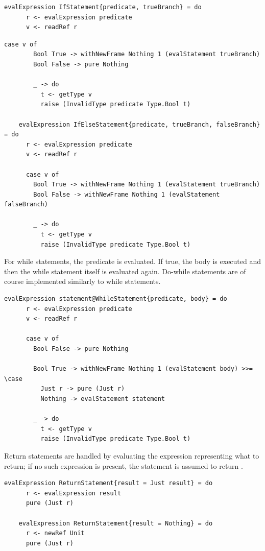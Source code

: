 \documentclass[UdineBachThesis,american,11pt]{PhdThesis}
\begin{document}
  \begin{lstlisting}[gobble=4,basicstyle=\ttfamily\small]
    evalExpression IfStatement{predicate, trueBranch} = do
      r <- evalExpression predicate
      v <- readRef r
  \end{lstlisting}

  \newpage

  \begin{lstlisting}[gobble=4,basicstyle=\ttfamily\small]
      case v of
        Bool True -> withNewFrame Nothing 1 (evalStatement trueBranch)
        Bool False -> pure Nothing

        _ -> do
          t <- getType v
          raise (InvalidType predicate Type.Bool t)

    evalExpression IfElseStatement{predicate, trueBranch, falseBranch} = do
      r <- evalExpression predicate
      v <- readRef r

      case v of
        Bool True -> withNewFrame Nothing 1 (evalStatement trueBranch)
        Bool False -> withNewFrame Nothing 1 (evalStatement falseBranch)

        _ -> do
          t <- getType v
          raise (InvalidType predicate Type.Bool t)
  \end{lstlisting}

  For while statements, the predicate is evaluated. If true, the body is
  executed and then the while statement itself is evaluated again. Do-while
  statements are of course implemented similarly to while statements.

  \begin{lstlisting}[gobble=4,basicstyle=\ttfamily\small]
    evalExpression statement@WhileStatement{predicate, body} = do
      r <- evalExpression predicate
      v <- readRef r

      case v of
        Bool False -> pure Nothing

        Bool True -> withNewFrame Nothing 1 (evalStatement body) >>= \case
          Just r -> pure (Just r)
          Nothing -> evalStatement statement

        _ -> do
          t <- getType v
          raise (InvalidType predicate Type.Bool t)
  \end{lstlisting}

  Return statements are handled by evaluating the expression representing what
  to return; if no such expression is present, the statement is assumed to
  return \lstinline@unit@.

  \begin{lstlisting}[gobble=4,basicstyle=\ttfamily\small]
    evalExpression ReturnStatement{result = Just result} = do
      r <- evalExpression result
      pure (Just r)

    evalExpression ReturnStatement{result = Nothing} = do
      r <- newRef Unit
      pure (Just r)
  \end{lstlisting}
\end{document}
